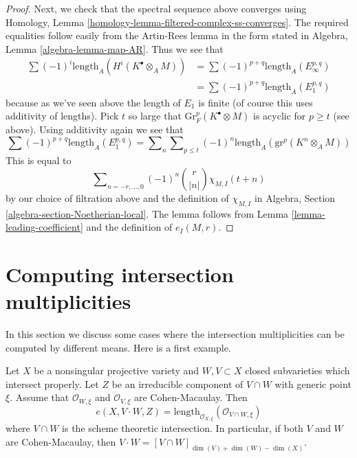 \begin{proof}
\medskip\noindent
Next, we check that the spectral sequence above converges
using Homology, Lemma \ref{homology-lemma-filtered-complex-ss-converges}.
The required equalities follow easily from the Artin-Rees lemma
in the form stated in Algebra, Lemma \ref{algebra-lemma-map-AR}.
Thus we see that
\begin{align*}
\sum (-1)^i\text{length}_A(H^i(K^\bullet \otimes_A M))
& =
\sum (-1)^{p + q} \text{length}_A(E_\infty^{p, q}) \\
& =
\sum (-1)^{p + q} \text{length}_A(E_1^{p, q})
\end{align*}
because as we've seen above the length of $E_1$ is finite
(of course this uses additivity of lengths). Pick $t$ so
large that $\text{Gr}^p_F(K^\bullet \otimes M)$
is acyclic for $p \geq t$ (see above). Using
additivity again we see that
$$
\sum (-1)^{p + q} \text{length}_A(E_1^{p, q}) =
\sum\nolimits_n \sum\nolimits_{p \leq t}
(-1)^n \text{length}_A(\text{gr}^p(K^n \otimes_A M))
$$
This is equal to
$$
\sum\nolimits_{n = -r, \ldots, 0} (-1)^n{r \choose |n|} \chi_{M, I}(t + n)
$$
by our choice of filtration above and the definition of $\chi_{M, I}$ in
Algebra, Section \ref{algebra-section-Noetherian-local}.
The lemma follows from Lemma \ref{lemma-leading-coefficient}
and the definition of $e_I(M, r)$.
\end{proof}


\section{Computing intersection multiplicities}
\label{section-computing-intersection-multiplicities}

\noindent
In this section we discuss some cases where the intersection multiplicities
can be computed by different means. Here is a first example.

\begin{lemma}
\label{lemma-intersection-multiplicity-CM}
Let $X$ be a nonsingular projective variety and $W, V \subset X$ closed
subvarieties which intersect properly. Let $Z$ be an irreducible component
of $V \cap W$ with generic point $\xi$. Assume that $\mathcal{O}_{W, \xi}$
and $\mathcal{O}_{V, \xi}$ are Cohen-Macaulay. Then
$$
e(X, V \cdot W, Z) =
\text{length}_{\mathcal{O}_{X, \xi}}(\mathcal{O}_{V \cap W, \xi})
$$
where $V \cap W$ is the scheme theoretic intersection.
In particular, if both $V$ and $W$ are Cohen-Macaulay, then
$V \cdot W = [V \cap W]_{\dim(V) + \dim(W) - \dim(X)}$.
\end{lemma}

